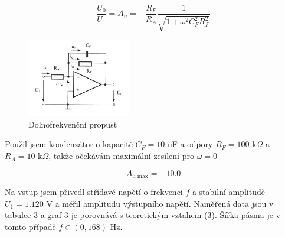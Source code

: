 \documentclass[a4paper,11pt]{article}
\begin{document}
\begin{equation}
\frac{U_0}{U_1} = A_u = -\frac{R_F}{R_A} \frac{1}{ \sqrt{1 + \omega^2 C_F^2 R_F^2} } 
\end{equation}

\begin{figure}[h]
    \centering
    \includegraphics[width=0.4\textwidth]{propust.jpg}
    \caption{Dolnofrekvenční propust}
\end{figure}

Použil jsem kondenzátor o kapacitě $ C_F = 10  $ nF a odpory $ R_F = 100 $ k$\Omega$ a $ R_A = 10 $ k$ \Omega $, takže očekávám maximální zesílení pro $ \omega = 0 $ 

\begin{equation}
A_{\text{u max}} = - 10.0
\end{equation}


Na vstup jsem přivedl střídavé napětí o frekvenci $ f $ a stabilní amplitudě $ U_1 = 1.120 $ V a měřil amplitudu výstupního napětí. Naměřená data jsou v tabulce 3 a graf 3 je porovnává s teoretickým vztahem (3). Šířka pásma je v tomto případě $ f \in (0, 168) $ Hz.
\end{document}
